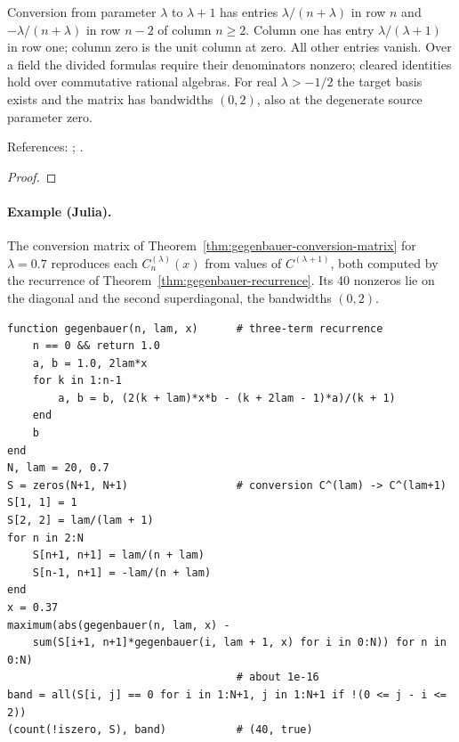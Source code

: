 \begin{theorem}
\label{thm:gegenbauer-conversion-matrix}
\leanok
Conversion from parameter $\lambda$ to $\lambda+1$ has entries
$\lambda/(n+\lambda)$ in row $n$ and $-\lambda/(n+\lambda)$ in row $n-2$
of column $n\ge2$. Column one has entry $\lambda/(\lambda+1)$ in row one;
column zero is the unit column at zero. All other entries vanish.
Over a field the divided formulas require their denominators nonzero;
cleared identities hold over commutative rational algebras.
For real $\lambda>-1/2$ the target basis exists and the matrix has bandwidths
$(0,2)$, also at the degenerate source parameter zero.

References: \cite[18.9.7]{dlmf}; \cite{olver-townsend}.
\end{theorem}
\begin{proof}
\leanok
\end{proof}

\paragraph{Example (Julia).} The conversion matrix of
Theorem~\ref{thm:gegenbauer-conversion-matrix} for $\lambda=0.7$ reproduces
each $C_n^{(\lambda)}(x)$ from values of $C^{(\lambda+1)}$, both computed by the
recurrence of Theorem~\ref{thm:gegenbauer-recurrence}. Its 40 nonzeros lie on
the diagonal and the second superdiagonal, the bandwidths $(0,2)$.
\begin{verbatim}
function gegenbauer(n, lam, x)      # three-term recurrence
    n == 0 && return 1.0
    a, b = 1.0, 2lam*x
    for k in 1:n-1
        a, b = b, (2(k + lam)*x*b - (k + 2lam - 1)*a)/(k + 1)
    end
    b
end
N, lam = 20, 0.7
S = zeros(N+1, N+1)                 # conversion C^(lam) -> C^(lam+1)
S[1, 1] = 1
S[2, 2] = lam/(lam + 1)
for n in 2:N
    S[n+1, n+1] = lam/(n + lam)
    S[n-1, n+1] = -lam/(n + lam)
end
x = 0.37
maximum(abs(gegenbauer(n, lam, x) -
    sum(S[i+1, n+1]*gegenbauer(i, lam + 1, x) for i in 0:N)) for n in 0:N)
                                    # about 1e-16
band = all(S[i, j] == 0 for i in 1:N+1, j in 1:N+1 if !(0 <= j - i <= 2))
(count(!iszero, S), band)           # (40, true)
\end{verbatim}

